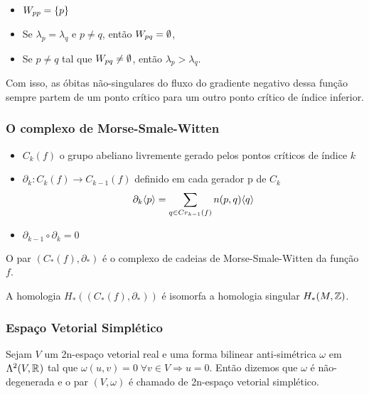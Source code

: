 \documentclass{beamer}
\begin{document}
\begin{footnotesize}
\begin{frame}
\begin{proposicao}
\begin{itemize}
				\item $W_{pp} = \{p\}$
				
				\item Se $\lambda_{p} = \lambda_{q}$ e $p\neq q$, então $W_{pq} = \emptyset$,
				
				\item Se $p \neq q$ tal que $W_{pq} \neq \emptyset$, então $\lambda_{p}>\lambda_{q}$.
			\end{itemize}
		\end{proposicao}
		
		Com isso, as óbitas não-singulares do fluxo do gradiente negativo dessa função sempre partem de um ponto crítico para um outro ponto crítico de índice inferior.

				
	\end{frame}
	
	\begin{frame}
		\frametitle{O complexo de Morse-Smale-Witten}
		\begin{definicao}
			\begin{itemize}
				\item $C_{k}(f)$ o grupo abeliano livremente gerado pelos pontos críticos de índice $k$ 
				
				\item 
				$\partial_{k}: C_{k}(f)\to C_{k-1}(f)$ definido em cada gerador p de $C_{k}$
				$$
				\partial_{k}\langle p\rangle=\sum_{q \in Cr_{k-1}(f)}n(p,q)\langle q\rangle
				$$
				
				\item $\partial_{k-1}\circ \partial_{k}  =0$
			\end{itemize}
			O par $(C_{*}(f), \partial_{*})$ é o complexo de cadeias de Morse-Smale-Witten  da função $f$.
		\end{definicao}
		
		
		\begin{teorema}
			 A homologia $H_{*}((C_{*}(f), \partial_{*})) $ é isomorfa a homologia singular $H_{*}(M, \mathbb{Z})$.
		\end{teorema}
	\end{frame}
	
	\begin{frame}
		\frametitle{Espaço Vetorial Simplético}
		\begin{definicao}
			Sejam $V$ um 2n-espaço vetorial real e uma forma bilinear anti-simétrica $\omega$ em $\Lambda^{2}(V, \mathbb{R}^{})$ tal que $\omega(u,v) = 0 \; \forall v \in V \Rightarrow u=0$. Então dizemos que $\omega$ é não-degenerada e o par $(V, \omega)$ é chamado de 2n-espaço vetorial simplético.
		\end{definicao}
	

\end{frame}
\end{footnotesize}
\end{document}

